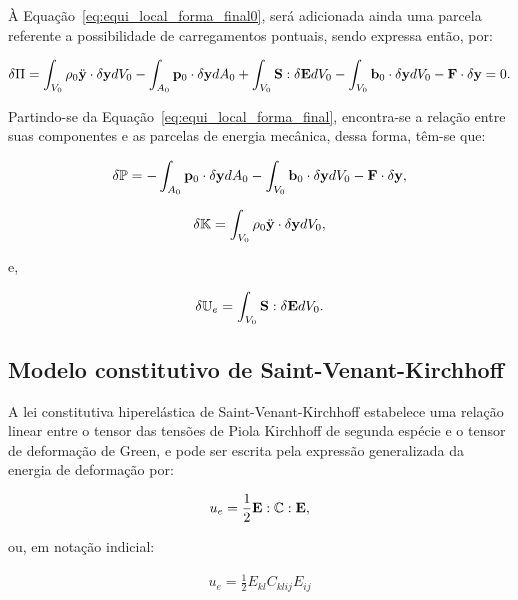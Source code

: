 À Equação~\eqref{eq:equi_local_forma_final0}, será adicionada ainda uma parcela referente a possibilidade de carregamentos pontuais, sendo expressa então, por:

\begin{align}
	\delta\Pi = \int_{V_{0}} \rho_{0} \ddot{\mathbf{y}} \cdot \delta\mathbf{y} dV_{0} - \int_{A_{0}} \mathbf{p}_{0} \cdot \delta\mathbf{y} dA_{0} +  \int_{V_{0}} \mathbf{S} : \delta\mathbf{E} dV_{0} - \int_{V_{0}}  \mathbf{b}_0 \cdot \delta\mathbf{y} dV_{0} - \mathbf{F} \cdot \delta\mathbf{y} = 0.
	\label{eq:equi_local_forma_final}
\end{align}

Partindo-se da Equação~\eqref{eq:equi_local_forma_final}, encontra-se a relação entre suas componentes e as parcelas de energia mecânica, dessa forma, têm-se que:

\begin{align}
	\delta\mathbb{P} = - \int_{A_{0}} \mathbf{p}_{0} \cdot \delta\mathbf{y} dA_{0} - \int_{V_{0}}  \mathbf{b}_0 \cdot \delta\mathbf{y} dV_{0} - \mathbf{F} \cdot \delta\mathbf{y},
\end{align}

\begin{align}
	\delta\mathbb{K} = \int_{V_{0}} \rho_{0} \ddot{\mathbf{y}} \cdot \delta\mathbf{y} dV_{0},
\end{align}

\noindent e,

\begin{align}
	\delta\mathbb{U}_e = \int_{V_{0}} \mathbf{S} : \delta\mathbf{E} dV_{0}.
\end{align}

\subsection{Modelo constitutivo de Saint-Venant-Kirchhoff}

A lei constitutiva hiperelástica de Saint-Venant-Kirchhoff estabelece uma relação linear entre o tensor das tensões de Piola Kirchhoff de segunda espécie e o tensor de deformação de Green, e pode ser escrita pela expressão generalizada da energia de deformação por:

\begin{align}
	u_{e} = \frac{1}{2} \mathbf{E} : \mathbb{C} : \mathbf{E},
\end{align}

\noindent ou, em notação indicial:

\begin{align}
	u_{e} = \frac{1}{2} E_{kl} C_{klij} E_{ij}
\end{align}

